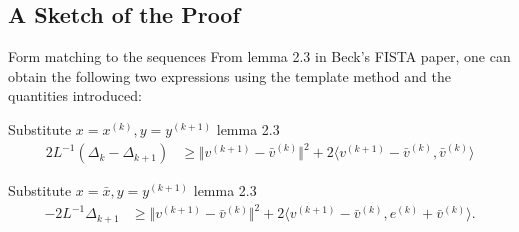 \documentclass[11pt]{beamer}
\begin{document}
    \subsection{A Sketch of the Proof}
        \begin{frame}{Form matching to the sequences}
            From lemma 2.3 in Beck's FISTA paper, one can obtain the following two expressions using the template method and the quantities introduced: 
            \begin{block}{Substitute $x = x^{(k)}, y = y^{(k + 1)}$ lemma 2.3}
                {\scriptsize
                    \begin{align*}
                        2L^{-1} (\Delta_k - \Delta_{k + 1})  
                        & \ge 
                        \Vert 
                            v^{(k + 1)} - \bar v^{(k)}
                        \Vert^2
                        + 
                        2\langle v^{(k + 1)} - \bar v^{(k)}, \bar v^{(k)}\rangle
                        \tag{*}
                    \end{align*}
                }
            \end{block}
            \begin{block}{Substitute $x = \bar x, y = y^{(k + 1)}$ lemma 2.3}
                {\scriptsize
                    \begin{align*}
                        -2L^{-1}\Delta_{k + 1} 
                        & \ge 
                        \Vert 
                            v^{(k + 1)} - \bar v^{(k)}
                        \Vert^2 + 
                        2\langle  
                            v^{(k + 1)} - \bar v^{(k)},
                            e^{(k)} + \bar v^{(k)}
                        \rangle.
                        \tag{$\star$}
                    \end{align*}
                }
            \end{block}
        \end{frame}
\end{document}
